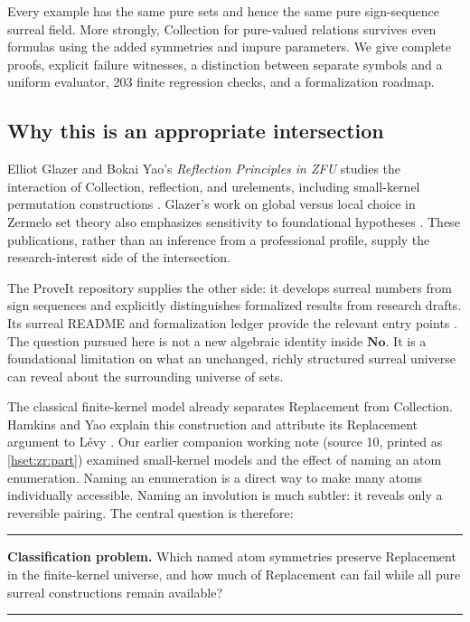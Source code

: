 \documentclass[11pt,letterpaper]{article}
\theoremstyle{definition}
\theoremstyle{remark}
\newcommand{\No}{\mathbf{No}}
\newenvironment{resultbox}{\par\medskip\noindent\begin{minipage}{\linewidth}\setlength{\parindent}{0pt}\hrule\medskip}{\medskip\hrule\end{minipage}\par\medskip}
\begin{document}
Every example has the same pure sets and hence the same pure sign-sequence surreal field. More strongly, Collection for pure-valued relations survives even formulas using the added symmetries and impure parameters. We give complete proofs, explicit failure witnesses, a distinction between separate symbols and a uniform evaluator, 203 finite regression checks, and a formalization roadmap.

\subsection{Why this is an appropriate intersection}
Elliot Glazer and Bokai Yao's \emph{Reflection Principles in ZFU} studies the interaction of Collection, reflection, and urelements, including small-kernel permutation constructions \cite{GlazerYao}. Glazer's work on global versus local choice in Zermelo set theory also emphasizes sensitivity to foundational hypotheses \cite{GlazerChoice}. These publications, rather than an inference from a professional profile, supply the research-interest side of the intersection.

The ProveIt repository supplies the other side: it develops surreal numbers from sign sequences and explicitly distinguishes formalized results from research drafts. Its surreal README and formalization ledger provide the relevant entry points \cite{ProveItSurrealNS}. The question pursued here is not a new algebraic identity inside $\No$. It is a foundational limitation on what an unchanged, richly structured surreal universe can reveal about the surrounding universe of sets.

The classical finite-kernel model already separates Replacement from Collection. Hamkins and Yao explain this construction and attribute its Replacement argument to L\'evy \cite{HamkinsYao}. Our earlier companion working note (source 10, printed as \cref{hset:zr:part}) examined small-kernel models and the effect of naming an atom enumeration. Naming an enumeration is a direct way to make many atoms individually accessible. Naming an involution is much subtler: it reveals only a reversible pairing. The central question is therefore:

\begin{resultbox}
\textbf{Classification problem.} Which named atom symmetries preserve Replacement in the finite-kernel universe, and how much of Replacement can fail while all pure surreal constructions remain available?
\end{resultbox}
\end{document}

